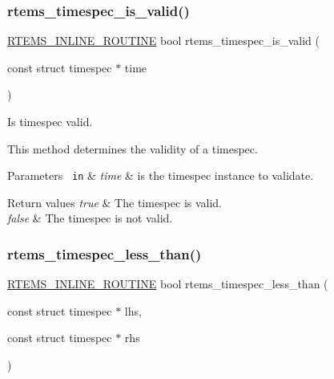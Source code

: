 \subsubsection{\texorpdfstring{rtems\_timespec\_is\_valid()}{rtems\_timespec\_is\_valid()}}
{\footnotesize\ttfamily \mbox{\hyperlink{group__RTEMSScoreBaseDefs_gac216239df231d5dbd15e3520b0b9313f}{R\+T\+E\+M\+S\+\_\+\+I\+N\+L\+I\+N\+E\+\_\+\+R\+O\+U\+T\+I\+NE}} bool rtems\+\_\+timespec\+\_\+is\+\_\+valid (\begin{DoxyParamCaption}\item[{const struct timespec $\ast$}]{time }\end{DoxyParamCaption})}



Is timespec valid. 

This method determines the validity of a timespec.


\begin{DoxyParams}[1]{Parameters}
\mbox{\texttt{ in}}  & {\em time} & is the timespec instance to validate.\\
\hline
\end{DoxyParams}

\begin{DoxyRetVals}{Return values}
{\em true} & The timespec is valid. \\
\hline
{\em false} & The timespec is not valid. \\
\hline
\end{DoxyRetVals}
\mbox{\label{group__TimespecAPI_gaf258c96a1ed63d4a954dcc0b00d7dfa8}} 
\subsubsection{\texorpdfstring{rtems\_timespec\_less\_than()}{rtems\_timespec\_less\_than()}}
{\footnotesize\ttfamily \mbox{\hyperlink{group__RTEMSScoreBaseDefs_gac216239df231d5dbd15e3520b0b9313f}{R\+T\+E\+M\+S\+\_\+\+I\+N\+L\+I\+N\+E\+\_\+\+R\+O\+U\+T\+I\+NE}} bool rtems\+\_\+timespec\+\_\+less\+\_\+than (\begin{DoxyParamCaption}\item[{const struct timespec $\ast$}]{lhs,  }\item[{const struct timespec $\ast$}]{rhs }\end{DoxyParamCaption})}



